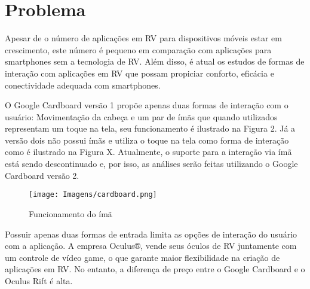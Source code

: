 \chapter{Problema}
\label{c.problema}

Apesar de o número de aplicações em RV para dispositivos móveis estar em crescimento, este número é pequeno em comparação com aplicações para smartphones sem a tecnologia de RV. Além disso, é atual os estudos de formas de interação com aplicações em RV que possam propiciar conforto, eficácia e conectividade adequada com smartphones. 

O Google Cardboard versão 1 propõe apenas duas formas de interação com o usuário: Movimentação da cabeça e um par de ímãs que quando utilizados representam um toque na tela, seu funcionamento é ilustrado na Figura 2. Já a versão dois não possui ímãs e utiliza o toque na tela como forma de interação como é ilustrado na Figura X. Atualmente, o suporte para a interação via ímã está sendo descontinuado e, por isso, as análises serão feitas utilizando o Google Cardboard versão 2.

\begin{figure}[h]
	\caption{\small Funcionamento do ímã}
	\centering
	\texttt{[image: Imagens/cardboard.png]}
	\label{f.cardboard1}
\end{figure}

Possuir apenas duas formas de entrada limita as opções de interação do usuário com a aplicação. A empresa Oculus®, vende seus óculos de RV juntamente com um controle de vídeo game, o que garante maior flexibilidade na criação de aplicações em RV. No entanto, a diferença de preço entre o Google Cardboard e o Oculus Rift é alta. 



